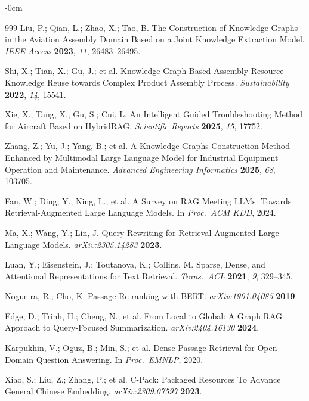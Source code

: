 \documentclass[applsci,article,submit,pdftex,moreauthors]{Definitions/mdpi}
\begin{document}
\begin{adjustwidth}{-\extralength}{0cm}
{\begin{thebibliography}{999}
Liu, P.; Qian, L.; Zhao, X.; Tao, B. The Construction of Knowledge Graphs in the Aviation Assembly Domain Based on a Joint Knowledge Extraction Model. {\em IEEE Access} {\bf 2023}, {\em 11}, 26483--26495.

Shi, X.; Tian, X.; Gu, J.; et al. Knowledge Graph-Based Assembly Resource Knowledge Reuse towards Complex Product Assembly Process. {\em Sustainability} {\bf 2022}, {\em 14}, 15541.

Xie, X.; Tang, X.; Gu, S.; Cui, L. An Intelligent Guided Troubleshooting Method for Aircraft Based on HybridRAG. {\em Scientific Reports} {\bf 2025}, {\em 15}, 17752.

Zhang, Z.; Yu, J.; Yang, B.; et al. A Knowledge Graphs Construction Method Enhanced by Multimodal Large Language Model for Industrial Equipment Operation and Maintenance. {\em Advanced Engineering Informatics} {\bf 2025}, {\em 68}, 103705.

Fan, W.; Ding, Y.; Ning, L.; et al. A Survey on RAG Meeting LLMs: Towards Retrieval-Augmented Large Language Models. In {\em Proc.\ ACM KDD}, 2024.

Ma, X.; Wang, Y.; Lin, J. Query Rewriting for Retrieval-Augmented Large Language Models. {\em arXiv:2305.14283} {\bf 2023}.

Luan, Y.; Eisenstein, J.; Toutanova, K.; Collins, M. Sparse, Dense, and Attentional Representations for Text Retrieval. {\em Trans.\ ACL} {\bf 2021}, {\em 9}, 329--345.

Nogueira, R.; Cho, K. Passage Re-ranking with BERT. {\em arXiv:1901.04085} {\bf 2019}.

Edge, D.; Trinh, H.; Cheng, N.; et al. From Local to Global: A Graph RAG Approach to Query-Focused Summarization. {\em arXiv:2404.16130} {\bf 2024}.

Karpukhin, V.; Oguz, B.; Min, S.; et al. Dense Passage Retrieval for Open-Domain Question Answering. In {\em Proc.\ EMNLP}, 2020.

Xiao, S.; Liu, Z.; Zhang, P.; et al. C-Pack: Packaged Resources To Advance General Chinese Embedding. {\em arXiv:2309.07597} {\bf 2023}.


\end{thebibliography}}
\end{adjustwidth}
\end{document}
